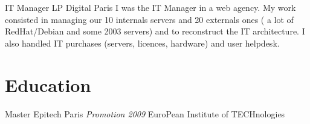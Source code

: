 \documentclass[11pt,a4paper,sans]{moderncv}
\begin{document}
{IT Manager}
{LP Digital}
{Paris}
{}
{I was the IT Manager in a web agency.\newline{}
My work consisted in managing our 10 internals servers and 20 externals ones
( a lot of RedHat/Debian and some 2003 servers) and to reconstruct the IT
architecture.
I also handled IT purchases (servers, licences, hardware) and user helpdesk.
}

\section{Education}

{Master}
{Epitech}
{Paris}
{\textit{Promotion 2009}}
{EuroPean Institute of TECHnologies}
\end{document}
